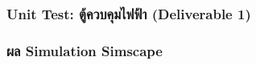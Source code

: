 \subsubsection{Unit Test: ตู้ควบคุมไฟฟ้า (Deliverable 1)}
\label{subsubsec:unit_test_electrical_cabinet}





\subsubsection{ผล Simulation Simscape}
\label{subsubsec:simscape_simulation_results_p2}
